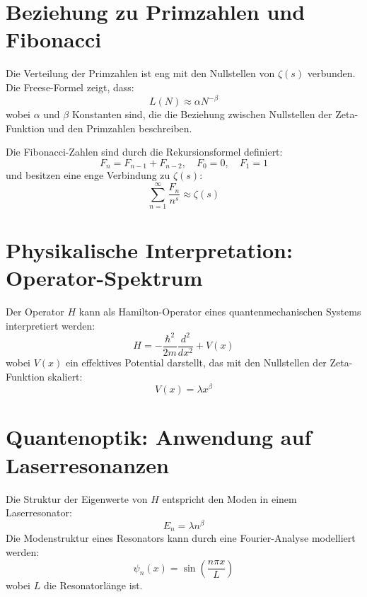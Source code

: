 \documentclass[a4paper,12pt]{article}
\begin{document}
\section{Beziehung zu Primzahlen und Fibonacci}
Die Verteilung der Primzahlen ist eng mit den Nullstellen von $\zeta(s)$ verbunden. Die Freese-Formel zeigt, dass:
\begin{equation}
    L(N) \approx \alpha N^{-\beta}
\end{equation}
wobei $\alpha$ und $\beta$ Konstanten sind, die die Beziehung zwischen Nullstellen der Zeta-Funktion und den Primzahlen beschreiben.

Die Fibonacci-Zahlen sind durch die Rekursionsformel definiert:
\begin{equation}
    F_n = F_{n-1} + F_{n-2}, \quad F_0 = 0, \quad F_1 = 1
\end{equation}
und besitzen eine enge Verbindung zu $\zeta(s)$:
\begin{equation}
    \sum_{n=1}^{\infty} \frac{F_n}{n^s} \approx \zeta(s)
\end{equation}

\section{Physikalische Interpretation: Operator-Spektrum}
Der Operator $H$ kann als Hamilton-Operator eines quantenmechanischen Systems interpretiert werden:
\begin{equation}
    H = -\frac{\hbar^2}{2m} \frac{d^2}{dx^2} + V(x)
\end{equation}
wobei $V(x)$ ein effektives Potential darstellt, das mit den Nullstellen der Zeta-Funktion skaliert:
\begin{equation}
    V(x) = \lambda x^\beta
\end{equation}

\section{Quantenoptik: Anwendung auf Laserresonanzen}
Die Struktur der Eigenwerte von $H$ entspricht den Moden in einem Laserresonator:
\begin{equation}
    E_n = \lambda n^\beta
\end{equation}
Die Modenstruktur eines Resonators kann durch eine Fourier-Analyse modelliert werden:
\begin{equation}
    \psi_n(x) = \sin \left( \frac{n \pi x}{L} \right)
\end{equation}
wobei $L$ die Resonatorlänge ist.
\end{document}
